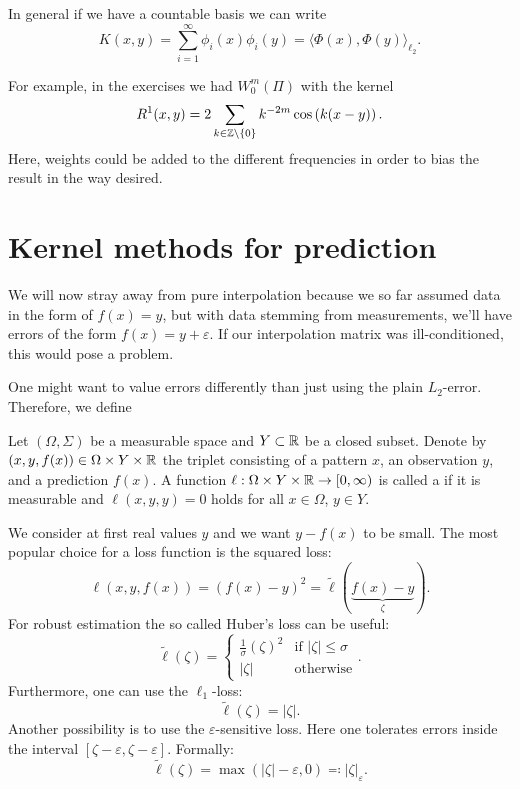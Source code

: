 \documentclass[../lecture-notes.tex]{subfiles}
\begin{document}
In general if we have a countable basis we can write
\[
	K(x, y) = \sum_{i=1}^\infty \phi_i(x) \phi_i(y) = \langle \Phi(x), \Phi(y) \rangle_{\ell_2}.
\]

For example, in the exercises we had $W_0^m(\Pi)$ with the kernel
\[
	R^1(x, y) = 2 \sum_{k \in \mathbb{Z} \setminus \{ 0 \}} k^{-2m} \cos \left( k(x-y) \right).
\]
Here, weights could be added to the different frequencies in order to bias the result in the way desired.

\section{Kernel methods for prediction} %
\label{sec:1.4}
We will now stray away from pure interpolation because we so far assumed data in the form of $f(x) = y$, but with data stemming from measurements, we'll have errors of the form $f(x) = y + \varepsilon$. If our interpolation matrix was ill-conditioned, this would pose a problem.

One might want to value errors differently than just using the plain $L_2$-error. Therefore, we define
\begin{definition} %
\label{thm:38}
Let $(\Omega, \Sigma)$ be a measurable space and $Y \subset \mathbb{R}$ be a closed subset.
Denote by $(x, y, f(x)) \in \Omega \times Y \times \mathbb{R}$ the triplet consisting of a pattern $x$, an observation $y$, and a prediction $f(x)$.
A function $\ell : \Omega \times Y \times \mathbb{R} \to [0, \infty)$ is called a  if it is measurable and $\ell(x, y, y) = 0$ holds for all $x \in \Omega$, $y \in Y$.
\end{definition}
We consider at first real values $y$ and we want $y - f(x)$ to be small.
The most popular choice for a loss function is the squared loss:
\[
	\ell(x, y, f(x)) = \left( f(x) - y \right)^2 = \tilde{\ell}( \underbrace{f(x) - y}_{\zeta} ).
\]
For robust estimation the so called Huber's loss can be useful:
\[
	\tilde{\ell}(\zeta) = \begin{cases}
	\frac{1}{\sigma} (\zeta)^2 & \text{if } |\zeta| \leq \sigma \\
	|\zeta| & \text{otherwise}
	\end{cases}.
\]
Furthermore, one can use the $\ell_1$-loss:
\[
	\tilde{\ell}(\zeta) = |\zeta|.
\]
Another possibility is to use the $\varepsilon$-sensitive loss. Here one tolerates errors inside the interval $[\zeta - \varepsilon, \zeta - \varepsilon]$. Formally:
\[
	\tilde{\ell}(\zeta) = \max \left( |\zeta| - \varepsilon, 0 \right) \eqqcolon |\zeta|_{\varepsilon}.
\]
\end{document}
